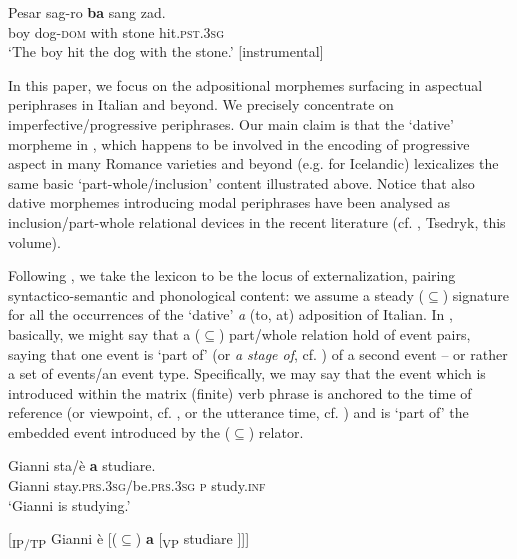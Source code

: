\documentclass[output=paper,modfonts,nonflat,newtxmath,colorlinks,citecolor=brown]{langsci/langscibook}
\begin{document}
     \ex  \label{ex:franco:7b}
    \gll Pesar sag-ro  \textbf{ba} sang zad.\\
        boy dog-\textsc{dom}  with   stone   hit.\textsc{pst.3sg} \\
    \glt ‘The boy hit the dog with the stone.’ \hfill [instrumental]
    \z
    \z

In this paper, we focus on the adpositional morphemes surfacing in aspectual periphrases in Italian and beyond. We precisely concentrate on imperfective/progressive periphrases. Our main claim is that the ‘dative’ morpheme in , which happens to be involved in the encoding of progressive aspect in many Romance varieties \citep{ManziniLorussoSavoia2017} and beyond (e.g. \citealt{Johannsdottir2011} for Icelandic) lexicalizes the same basic ‘part-whole/inclusion’ content illustrated above. Notice that also dative morphemes introducing modal periphrases have been analysed as inclusion/part-whole relational devices in the recent literature (cf. \citealt{BjorkmanCowper2016}, Tsedryk, this volume). 

Following \citet{BerwickChomsky2011}, we take the lexicon to be the locus of externalization, pairing syntactico-semantic and phonological content: we assume a steady (${\subseteq}$) signature for all the occurrences of the ‘dative’ \textit{a} (to, at) adposition of Italian. In , basically, we might say that a (${\subseteq}$) part/whole relation hold of event pairs, saying that one event is ‘part of’ (or \textit{a stage of}, cf. \citealt{Landman1992}) of a second event – or rather a set of events/an event type. Specifically, we may say that the event which is introduced within the matrix (finite) verb phrase is anchored to the time of reference (or viewpoint, cf. \citealt{Comrie1976}, or the utterance time, cf. \citealt{Higginbotham2009}) and is ‘part of’ the embedded event introduced by the (${\subseteq}$) relator. %

\ea%
    \label{ex:franco:8}
    \ea \label{ex:franco:8a}
    \gll Gianni sta/è \textbf{a} studiare.\\
        Gianni stay.\textsc{prs.3sg}/be.\textsc{prs.3sg} \textsc{p} study.\textsc{inf}\\
    \glt ‘Gianni is studying.’
    
     \ex \label{ex:franco:8b}
     {[}\textsubscript{IP/TP} Gianni è [(${\subseteq}$) \textbf{a} [\textsubscript{VP} studiare {]]]}
    \z
    \z
    
\end{document}
